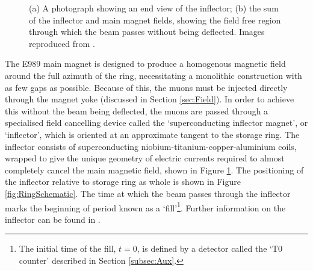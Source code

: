 \begin{figure}[b!]
\centering{}
\hfill
\hfill
{}
\caption{(a) A photograph showing an end view of the inflector; (b) the sum of the inflector and main magnet fields, showing the field free region through which the beam passes without being deflected. Images reproduced from \cite{InflectorCommissioning}.}
\label{fig:Inflector}
\end{figure} 

The E989 main magnet is designed to produce a homogenous magnetic field around the full azimuth of the ring, necessitating a monolithic construction with as few gaps as possible. Because of this, the muons must be injected directly through the magnet yoke (discussed in Section \ref{sec:Field}). In order to achieve this without the beam being deflected, the muons are passed through a specialised field cancelling device called the `superconducting inflector magnet', or `inflector', which is oriented at an approximate tangent to the storage ring. The inflector consists of superconducting niobium-titanium-copper-aluminium coils, wrapped to give the unique geometry of electric currents required to almost completely cancel the main magnetic field, shown in Figure \ref{fig:Inflector}. The positioning of the inflector relative to storage ring as whole is shown in Figure \ref{fig:RingSchematic}. The time at which the beam passes through the inflector marks the beginning of period known as a `fill'\footnote{The initial time of the fill, $t=0$, is defined by a detector called the `T0 counter' described in Section \ref{subsec:Aux}.}. Further information on the inflector can be found in \cite{InflectorCommissioning}.

